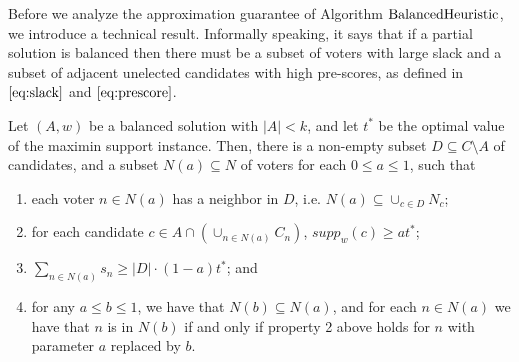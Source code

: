 Before we analyze the approximation guarantee of Algorithm $\operatorname{BalancedHeuristic}$, we introduce a technical result. 
Informally speaking, it says that if a partial solution is balanced then there must be a subset of voters with large slack and a subset of adjacent unelected candidates with high pre-scores, as defined in $\eqref{eq:slack}$ and $\eqref{eq:prescore}$.

\begin{lemma}\label{lem:N_a}
Let $(A,w)$ be a balanced solution with $|A|< k$, and let $t^*$ be the optimal value of the maximin support instance. 
Then, there is a non-empty subset $D\subseteq C\setminus A$ of candidates, and a subset $N(a)\subseteq N$ of voters for each $0\leq a \leq 1$, such that 
\begin{enumerate}
    \item each voter $n\in N(a)$ has a neighbor in $D$, i.e. $N(a)\subseteq \cup_{c\in D}N_c$; 
     \item for each candidate $c\in A\cap(\cup_{n\in N(a)} C_n)$, $supp_w(c)\geq at^*$;
     \item $\sum_{n\in N(a)} s_n \geq |D|\cdot (1-a) t^*$; and
     \item for any $a\leq b\leq 1$, we have that $N(b)\subseteq N(a)$, and for each $n\in N(a)$ we have that $n$ is in $N(b)$ if and only if property 2 above holds for $n$ with parameter $a$ replaced by $b$. 
\end{enumerate}
\end{lemma}

